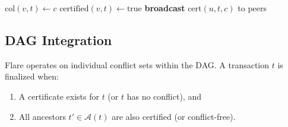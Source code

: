 \begin{algorithm}[H]
\caption{Flare Certificate Verification and Adoption}
\label{alg:flare-cert}
\begin{algorithmic}[1]
        \State $\text{col}(v, t) \gets c$
        \State $\text{certified}(v, t) \gets \text{true}$
        \State \textbf{broadcast} $\text{cert}(u, t, c)$ to peers
    \EndIf
\EndFunction
\end{algorithmic}
\end{algorithm}

\subsection{DAG Integration}

Flare operates on individual conflict sets within the DAG. A transaction $t$ is finalized
when:
\begin{enumerate}[nosep]
\item A certificate exists for $t$ (or $t$ has no conflict), and
\item All ancestors $t' \in \mathcal{A}(t)$ are also certified (or conflict-free).
\end{enumerate}

